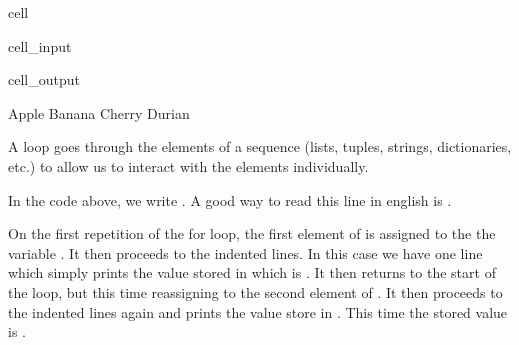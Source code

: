 \documentclass[letterpaper,10pt,english]{jupyterBook}
\begin{document}
\begin{sphinxuseclass}{cell}\begin{sphinxVerbatimInput}

\begin{sphinxuseclass}{cell_input}
\begin{sphinxVerbatim}[commandchars=\\\{\}]
  \PYG{p}{[}\PYG{p}{]}

   
\end{sphinxVerbatim}

\end{sphinxuseclass}\end{sphinxVerbatimInput}
\begin{sphinxVerbatimOutput}

\begin{sphinxuseclass}{cell_output}
\begin{sphinxVerbatim}[commandchars=\\\{\}]
Apple
Banana
Cherry
Durian
\end{sphinxVerbatim}

\end{sphinxuseclass}\end{sphinxVerbatimOutput}

\end{sphinxuseclass}
\sphinxAtStartPar
A  loop goes through the elements of a sequence (lists, tuples, strings, dictionaries, etc.) to allow us to interact with the elements individually.

\sphinxAtStartPar
In the code above, we write . A good way to read this line in english is .

\sphinxAtStartPar
On the first repetition of the for loop, the first element of  is assigned to the the variable . It then proceeds to the indented lines. In this case we have one line which simply prints the value stored in  which is . It then returns to the start of the loop, but this time reassigning  to the second element of . It then proceeds to the indented lines again and prints the value store in . This time the stored value is .
\end{document}
